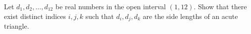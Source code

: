Let $d_1,d_2,\ldots,d_{12}$ be real numbers in the open interval $(1,12)$. Show that there exist distinct indices $i,j,k$ such that $d_i,d_j,d_k$ are the side lengths of an acute triangle.